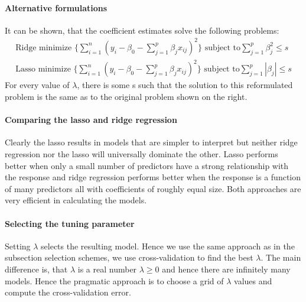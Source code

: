 \documentclass[../document.tex]{subfiles}
\begin{document}
	\paragraph{Alternative formulations}
	It can be shown, that the coefficient estimates solve the following problems:
	\begin{equation}
	\begin{split}
		\text{Ridge minimize }\{\sum_{i=1}^{n}(y_{i}-\beta_{0}-\sum_{j=1}^{p}\beta_{j}x_{ij})^2\}\text{ subject to}\sum_{j=1}^{p}\beta_{j}^2\leq s\\
		\text{Lasso minimize }\{\sum_{i=1}^{n}(y_{i}-\beta_{0}-\sum_{j=1}^{p}\beta_{j}x_{ij})^2\}\text{ subject to}\sum_{j=1}^{p}|\beta_{j}|\leq s
	\end{split}
	\end{equation}
	For every value of \(\lambda\), there is some s such that the solution to this reformulated problem is the same as to the original problem shown on the right.
	\paragraph{Comparing the lasso and ridge regression}
	Clearly the lasso results in models that are simpler to interpret but neither ridge regression nor the lasso will universally dominate the other. Lasso performs better when only a small number of predictors have a strong relationship with the response and ridge regression performs better when the response is a function of many predictors all with coefficients of roughly equal size. Both approaches are very efficient in calculating the models.
	\paragraph{Selecting the tuning parameter}
	Setting \(\lambda\) selects the resulting model. Hence we use the same approach as in the subsection selection schemes, we use cross-validation to find the best \(\lambda\). The main difference is, that \(\lambda\) is a real number \(\lambda \geq0\) and hence there are infinitely many models. Hence the pragmatic approach is to choose a grid of \(\lambda\) values and compute the cross-validation error.
\end{document}
